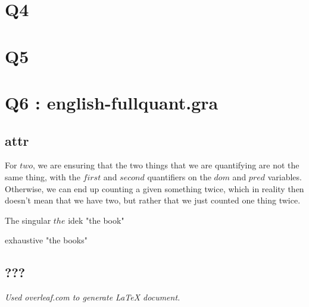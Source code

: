\documentclass[12pt, letterpaper]{article}
\begin{document}
\section{Q4}

\section{Q5}


\section{Q6 : english-fullquant.gra}
\subsection{attr}


For $two$, we are ensuring that the two things that we are quantifying are not the same thing, with the $first$ and $second$ quantifiers on the $dom$ and $pred$ variables. Otherwise, we can end up counting a given something twice, which in reality then doesn't mean that we have two, but rather that we just counted one thing twice. 


The singular $the$ idek
"the book"

exhaustive 
"the books"

\subsection{???}

\begin{center}
\textit{Used overleaf.com to generate LaTeX document.}
\end{center}
\end{document}
